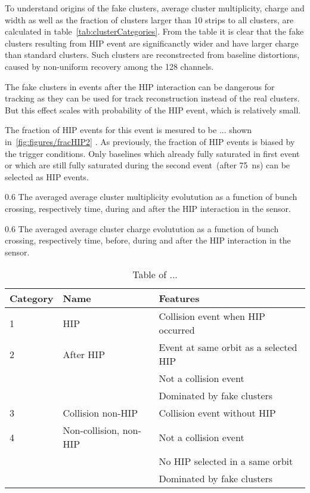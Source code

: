 To understand origins of the fake clusters, average cluster multiplicity, charge and width as well as the fraction of clusters larger than 10 strips to all clusters, are calculated in table~\ref{tab:clusterCategories}. From the table it is clear that the fake clusters resulting from HIP event are significanctly wider and have larger charge than standard clusters. Such clusters are reconstrected from baseline distortions, caused by non-uniform recovery among the 128 channels.

The fake clusters in events after the HIP interaction can be dangerous for tracking as they can be used for track reconstruction instead of the real clusters. But this effect scales with probability of the HIP event, which is relatively small.

The fraction of HIP events for this event is mesured to be ... shown in~\ref{fig:figures/fracHIP2} . As previously, the fraction of HIP events is biased by the trigger conditions. Only baselines which already fully saturated in first event or which are still fully saturated during the second event~(after 75~ns) can be selected as HIP events.


                 {0.6}       %
                 {The averaged average cluster multiplicity evolutution as a function of bunch crossing, respectively time,  during and after the HIP interaction in the sensor. } %

                 {0.6}       %
                 {The averaged average cluster charge evolutution as a function of bunch crossing, respectively time, before,  during and after the HIP interaction in the sensor. } %

\begin{table}[h]
\begin{center}
\begin{tabular}{|l|l|l|}
\hline
Category & Name  & Features \\
\hline
1 & HIP & Collision event when HIP occurred \\
\hline
2 & After HIP & Event at same orbit as a selected HIP \\
& & Not a collision event \\
& & Dominated by fake clusters \\
\hline
3 & Collision non-HIP & Collision event without HIP \\
\hline
4 & Non-collision, non-HIP  & Not a collision event \\
& & No HIP selected in a same orbit \\
& & Dominated by fake clusters \\
\hline
\end{tabular}
\caption[Table caption text]{Table of ... }
\label{tab:eventCategories}
\end{center}
\end{table}


